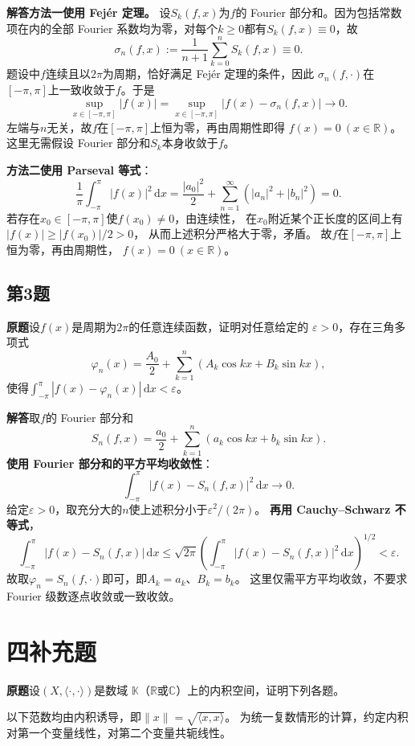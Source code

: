 \documentclass[11pt,a4paper]{ctexart}
\newcommand{\R}{\mathbb R}
\newcommand{\C}{\mathbb C}
\newcommand{\K}{\mathbb K}
\newcommand{\dd}{\,\mathrm d}
\newcommand{\norm}[1]{\lVert#1\rVert}
\newcommand{\ip}[2]{\langle#1,#2\rangle}
\newcommand{\problem}{\par\textbf{原题}\quad}
\newcommand{\solution}{\par\medskip\textbf{解答}\quad}
\begin{document}
\solution \textbf{方法一\quad 使用 Fej\'er 定理。}
设$S_k(f,x)$为$f$的 Fourier 部分和。因为包括常数项在内的全部
Fourier 系数均为零，对每个$k\ge0$都有$S_k(f,x)\equiv0$，故
\[
\sigma_n(f,x):=\frac1{n+1}\sum_{k=0}^{n}S_k(f,x)\equiv0.
\]
题设中$f$连续且以$2\pi$为周期，恰好满足 Fej\'er 定理的条件，因此
$\sigma_n(f,\cdot)$在$[-\pi,\pi]$上一致收敛于$f$。于是
\[
\sup_{x\in[-\pi,\pi]}|f(x)|
=\sup_{x\in[-\pi,\pi]}|f(x)-\sigma_n(f,x)|\longrightarrow0.
\]
左端与$n$无关，故$f$在$[-\pi,\pi]$上恒为零，再由周期性即得
$\boxed{f(x)=0\ (x\in\R)}$。
这里无需假设 Fourier 部分和$S_k$本身收敛于$f$。

\par\medskip\textbf{方法二\quad 使用 Parseval 等式}：
\[
\frac1\pi\int_{-\pi}^{\pi}|f(x)|^2\dd x
=\frac{|a_0|^2}{2}+\sum_{n=1}^{\infty}(|a_n|^2+|b_n|^2)=0.
\]
若存在$x_0\in[-\pi,\pi]$使$f(x_0)\ne0$，由连续性，
在$x_0$附近某个正长度的区间上有$|f(x)|\ge |f(x_0)|/2>0$，
从而上述积分严格大于零，矛盾。
故$f$在$[-\pi,\pi]$上恒为零，再由周期性，
$\boxed{f(x)=0\ (x\in\R)}$。

\subsection*{第3题}
\problem 设$f(x)$是周期为$2\pi$的任意连续函数，证明对任意给定的
$\varepsilon>0$，存在三角多项式
\[
\varphi_n(x)=\frac{A_0}{2}
+\sum_{k=1}^{n}(A_k\cos kx+B_k\sin kx),
\]
使得$\displaystyle\int_{-\pi}^{\pi}|f(x)-\varphi_n(x)|\dd x<\varepsilon$。

\solution 取$f$的 Fourier 部分和
\[
S_n(f,x)=\frac{a_0}{2}+\sum_{k=1}^{n}(a_k\cos kx+b_k\sin kx).
\]
\textbf{使用 Fourier 部分和的平方平均收敛性}：
\[
\int_{-\pi}^{\pi}|f(x)-S_n(f,x)|^2\dd x\longrightarrow0.
\]
给定$\varepsilon>0$，取充分大的$n$使上述积分小于$\varepsilon^2/(2\pi)$。
\textbf{再用 Cauchy--Schwarz 不等式}，
\[
\int_{-\pi}^{\pi}|f(x)-S_n(f,x)|\dd x
\le\sqrt{2\pi}
\left(\int_{-\pi}^{\pi}|f(x)-S_n(f,x)|^2\dd x\right)^{1/2}
<\varepsilon.
\]
故取$\boxed{\varphi_n=S_n(f,\cdot)}$即可，即$A_k=a_k$、$B_k=b_k$。
这里仅需平方平均收敛，不要求 Fourier 级数逐点收敛或一致收敛。

\newpage
\section*{四\quad 补充题}
\problem 设$(X,\langle\cdot,\cdot\rangle)$是数域
$\K$（$\R$或$\C$）上的内积空间，证明下列各题。

以下范数均由内积诱导，即$\norm{x}=\sqrt{\ip{x}{x}}$。
为统一复数情形的计算，约定内积对第一个变量线性，对第二个变量共轭线性。
\end{document}
